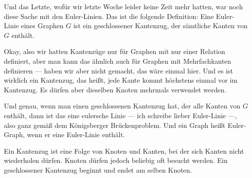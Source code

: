 \begin{spoken-clean}[00:03:38 - 00:05:40]
Und das Letzte, wofür wir letzte Woche leider keine Zeit mehr hatten, war noch diese Sache mit den Euler-Linien. Das ist die folgende Definition: Eine Euler-Linie eines Graphen $G$ ist ein geschlossener Kantenzug, der sämtliche Kanten von $G$ enthält. 

Okay, also wir hatten Kantenzüge nur für Graphen mit nur einer Relation definiert, aber man kann das ähnlich auch für Graphen mit Mehrfachkanten definieren --- haben wir aber nicht gemacht, das wäre einmal hier. Und es ist wirklich ein Kantenzug, das heißt, jede Kante kommt höchstens einmal vor im Kantenzug. Es dürfen aber dieselben Knoten mehrmals verwendet werden.

Und genau, wenn man einen geschlossenen Kantenzug hat, der alle Kanten von $G$ enthält, dann ist das eine eulersche Linie --- ich schreibe lieber Euler-Linie ---, also ganz gemäß dem Königsberger Brückenproblem. Und ein Graph heißt Euler-Graph, wenn er eine Euler-Linie enthält. 
\end{spoken-clean}

\begin{math-stroke}

\begin{explanation-of-steps}
Ein Kantenzug ist eine Folge von Knoten und Kanten, bei der sich Kanten nicht wiederholen dürfen. Knoten dürfen jedoch beliebig oft besucht werden. Ein geschlossener Kantenzug beginnt und endet am selben Knoten.
\end{explanation-of-steps}
\end{math-stroke}

\begin{ai-global-state-checkpoint-invisible-content}
\end{ai-global-state-checkpoint-invisible-content}

